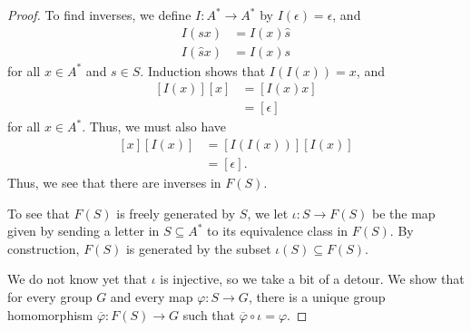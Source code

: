 \documentclass[10pt]{mypackage}
\begin{document}
\begin{proof}
  To find inverses, we define $I\colon A^{\ast}\rightarrow A^{\ast}$ by $I\left(\epsilon\right) = \epsilon$, and
  \begin{align*}
    I\left(sx\right) &= I(x)\hat{s}\\
    I\left(\hat{s}x\right) &= I(x)s
  \end{align*}
  for all $x\in A^{\ast}$ and $s\in S$. Induction shows that $I\left(I\left(x\right)\right) = x$, and
  \begin{align*}
    \left[I\left(x\right)\right]\left[x\right] &= \left[I\left(x\right)x\right]\\
                                               &= \left[\epsilon\right]
  \end{align*}
  for all $x\in A^{\ast}$. Thus, we must also have
  \begin{align*}
    \left[x\right]\left[I(x)\right] &= \left[I\left(I\left(x\right)\right)\right]\left[I\left(x\right)\right]\\
                                    &= \left[\epsilon\right].
  \end{align*}
  Thus, we see that there are inverses in $F(S)$.\newline

  To see that $F(S)$ is freely generated by $S$, we let $\iota\colon S\rightarrow F(S)$ be the map given by sending a letter in $S\subseteq A^{\ast}$ to its equivalence class in $F(S)$. By construction, $F(S)$ is generated by the subset $\iota\left(S\right)\subseteq F(S)$.\newline

  We do not know yet that $\iota$ is injective, so we take a bit of a detour. We show that for every group $G$ and every map $\varphi\colon S\rightarrow G$, there is a unique group homomorphism $\overline{\varphi}\colon F(S) \rightarrow G$ such that $\overline{\varphi}\circ \iota = \varphi$.\newline


\end{proof}
\end{document}
